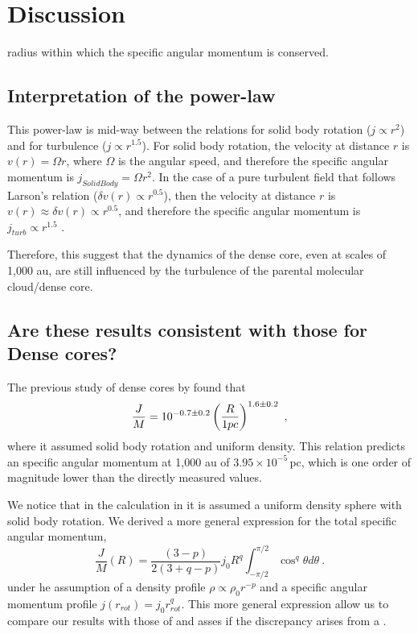 \section{Discussion}


radius within which the specific angular momentum is conserved. 

\subsection{Interpretation of the power-law}
This power-law is mid-way between the relations for solid body rotation ($j\propto r^{2}$) and for turbulence ($j\propto r^{1.5}$). 
For solid body rotation, the velocity at distance $r$ is $v(r)=\Omega r$, 
where $\Omega$ is the angular speed, 
and therefore the specific angular momentum is $j_{SolidBody}=\Omega r^2$. 
In the case of a pure turbulent field that follows Larson's relation ($\delta v(r) \propto r^{0.5}$), 
then the velocity at distance $r$ is $v(r)\approx \delta v(r) \propto r^{0.5}$, 
and therefore the specific angular momentum is $j_{turb}\propto r^{1.5}$ \citep{Burkert_2000}. 

Therefore, this suggest that the dynamics of the dense core, even at scales of 1,000 au, are still 
influenced by the turbulence of the parental molecular cloud/dense core.


\subsection{Are these results consistent with those for Dense cores?}
The previous study of dense cores by \cite{Goodman_1993} found that 
\begin{equation}
\frac{J}{M} = 10^{-0.7\pm0.2} \left(\frac{R}{\textrm 1 pc}\right)^{1.6\pm 0.2}~,
\end{equation}
where it assumed solid body rotation and uniform density. 
This relation predicts an specific angular momentum at 1,000 au of $3.95\times 10^{-5}$\,\kms pc, 
which is one order of magnitude lower than the directly measured values.

We notice that in the calculation in \cite{Goodman_1993} it is assumed a uniform density sphere 
with solid body rotation. 
We derived a more general expression for the total specific angular momentum, 
\begin{equation}
\frac{J}{M}(R) = \frac{(3-p)}{2(3+q-p)} j_0 R^{q} 
\int_{-\pi/2}^{\pi/2} \cos^q \theta d\theta~.
\end{equation}
under he assumption of a density profile $\rho \propto \rho_0 r^{-p}$ and a specific angular momentum 
profile $j(r_{rot}) = j_0 r_{rot}^q$. 
This more general expression allow us to compare our results with those of \cite{Goodman_1993} and asses 
if the discrepancy arises from a .


